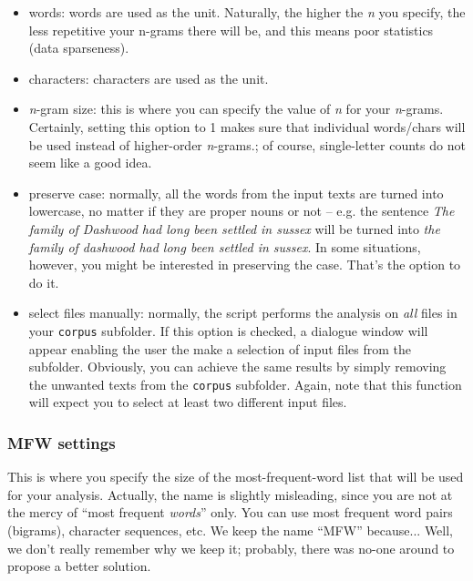 \documentclass[11pt,a4paper]{article}
\def\margin#1{\marginpar{\textcolor{blue}{\footnotesize\tt #1}}}
\def\code#1{{\tt #1}}
\begin{document}
\begin{itemize}
\item words: words are used as the unit. Naturally, the higher the \emph{n}
you specify, the less repetitive your n-grams there will be, and this
means poor statistics (data sparseness).\margin{analyzed.features=}\margin{"w"} 

\item characters: characters are used as the unit.\margin{"c"}

\item \emph{n}-gram size: this is where you can specify the value of \emph{n}
for your \emph{n}-grams. Certainly, setting this option to 1 makes
sure that individual words/chars will be used instead of higher-order
\emph{n}-grams.\margin{ngram.size=}\margin{<integer>}; of course,
single-letter counts do not seem like a good idea.

\item preserve case:\margin{preserve.case=}\margin{TRUE|FALSE} normally, all the words from the input texts are turned into lowercase, no matter if they are proper nouns or not -- e.g. the sentence \textit{The family of Dashwood had long been settled in sussex} will be turned into \textit{the family of dashwood had long been settled in sussex}. In some situations, however, you might be interested in preserving the case. That's the option to do it.

\item select files manually: normally, the script performs the analysis
on \emph{all} files in your \code{corpus} subfolder. If this option
is checked, a dialogue window will appear enabling the user the make
a selection of input files from the subfolder. Obviously, you can
achieve the same results by simply removing the unwanted texts from
the \code{corpus} subfolder. Again, note that this function will
expect you to select at least two different input files.\margin{[TBD]}
\end{itemize}


\subsubsection{MFW settings}

This is where you specify the size of the most-frequent-word list
that will be used for your analysis. Actually, the name is slightly
misleading, since you are not at the mercy of ``most frequent \emph{words}''
only. You can use most frequent word pairs (bigrams), character sequences,
etc. We keep the name ``MFW'' because... Well, we don't really remember
why we keep it; probably, there was no-one around to propose a better 
solution.
\end{document}
